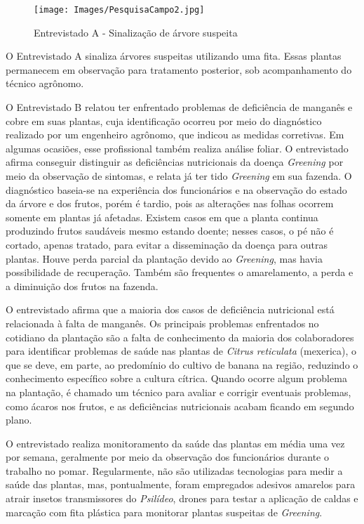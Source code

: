 \begin{figure}[H]
\centering
\caption{Entrevistado A - Sinalização de árvore suspeita }%
\label{fig:Pesquisa-1}
\texttt{[image: Images/PesquisaCampo2.jpg]}
\end{figure}

O Entrevistado A sinaliza árvores suspeitas utilizando uma fita. 
Essas plantas permanecem em observação para tratamento posterior, 
sob acompanhamento do técnico agrônomo.

\medskip
O Entrevistado B relatou ter enfrentado problemas de deficiência de manganês e cobre
em suas plantas, cuja identificação ocorreu por meio do diagnóstico realizado por um engenheiro 
agrônomo, que indicou as medidas corretivas. Em algumas ocasiões, esse profissional também 
realiza análise foliar. O entrevistado afirma conseguir distinguir as deficiências nutricionais 
da doença \textit{Greening} por meio da observação de sintomas, e relata já ter tido 
\textit{Greening} em sua fazenda. O diagnóstico baseia-se na experiência dos funcionários e 
na observação do estado da árvore e dos frutos, porém é tardio, pois as alterações nas folhas 
ocorrem somente em plantas já afetadas. Existem casos em que a planta continua produzindo frutos 
saudáveis mesmo estando doente; nesses casos, o pé não é cortado, apenas tratado, para evitar a 
disseminação da doença para outras plantas. Houve perda parcial da plantação devido ao 
\textit{Greening}, mas havia possibilidade de recuperação. Também são frequentes o amarelamento,
a perda e a diminuição dos frutos na fazenda. 

\medskip
O entrevistado afirma que a maioria dos casos de deficiência nutricional está relacionada
à falta de manganês. Os principais problemas enfrentados no cotidiano da plantação são a 
falta de conhecimento da maioria dos colaboradores para identificar problemas de saúde nas 
plantas de \textit{Citrus reticulata} (mexerica), o que se deve, em parte, ao predomínio do 
cultivo de banana na região, reduzindo o conhecimento específico sobre a cultura cítrica. 
Quando ocorre algum problema na plantação, é chamado um técnico para avaliar e corrigir 
eventuais problemas, como ácaros nos frutos, e as deficiências nutricionais acabam ficando 
em segundo plano. 

\medskip
O entrevistado realiza monitoramento da saúde das plantas em média uma vez por semana, 
geralmente por meio da observação dos funcionários durante o trabalho no pomar. 
Regularmente, não são utilizadas tecnologias para medir a saúde das plantas, mas, 
pontualmente, foram empregados adesivos amarelos para atrair insetos transmissores 
do \textit{Psilídeo}, drones para testar a aplicação de caldas e marcação com fita
plástica para monitorar plantas suspeitas de \textit{Greening}. 

